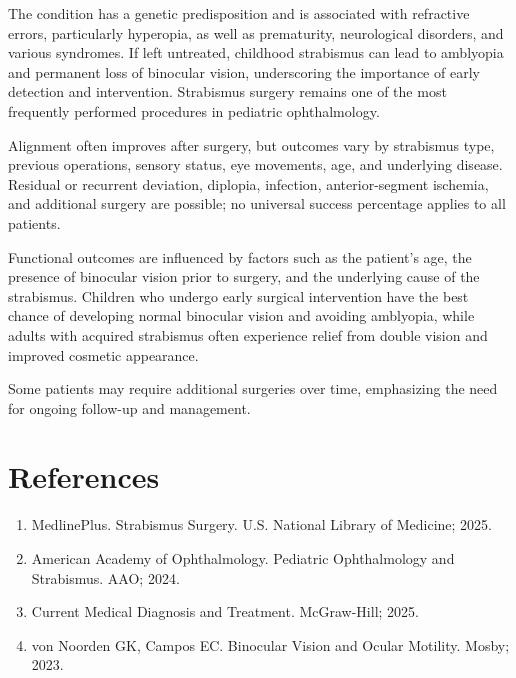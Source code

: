 The condition has a genetic predisposition and is associated with refractive errors, particularly hyperopia, as well as prematurity, neurological disorders, and various syndromes. If left untreated, childhood strabismus can lead to amblyopia and permanent loss of binocular vision, underscoring the importance of early detection and intervention. Strabismus surgery remains one of the most frequently performed procedures in pediatric ophthalmology.

Alignment often improves after surgery, but outcomes vary by strabismus type, previous operations, sensory status, eye movements, age, and underlying disease. Residual or recurrent deviation, diplopia, infection, anterior-segment ischemia, and additional surgery are possible; no universal success percentage applies to all patients.

Functional outcomes are influenced by factors such as the patient's age, the presence of binocular vision prior to surgery, and the underlying cause of the strabismus. Children who undergo early surgical intervention have the best chance of developing normal binocular vision and avoiding amblyopia, while adults with acquired strabismus often experience relief from double vision and improved cosmetic appearance. 

Some patients may require additional surgeries over time, emphasizing the need for ongoing follow-up and management.

\section*{References}
\begin{enumerate}
  \item MedlinePlus. Strabismus Surgery. U.S. National Library of Medicine; 2025.
  \item American Academy of Ophthalmology. Pediatric Ophthalmology and Strabismus. AAO; 2024.
  \item Current Medical Diagnosis and Treatment. McGraw-Hill; 2025.
  \item von Noorden GK, Campos EC. Binocular Vision and Ocular Motility. Mosby; 2023.
\end{enumerate}

\clearpage
